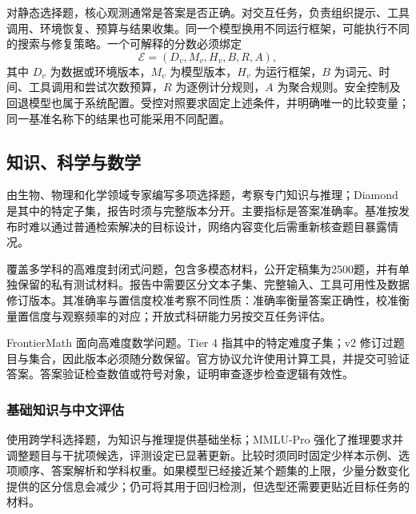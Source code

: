 \documentclass[../textbook.tex]{subfiles}
\begin{document}
对静态选择题，核心观测通常是答案是否正确。对交互任务，负责组织提示、工具调用、环境恢复、预算与结果收集。同一个模型换用不同运行框架，可能执行不同的搜索与修复策略。一个可解释的分数必须绑定
\begin{equation}
 \mathcal E=(D_v,M_v,H_v,B,R,A),
 \label{eq:eval-benchmark-protocol}
\end{equation}
其中 $D_v$ 为数据或环境版本，$M_v$ 为模型版本，$H_v$ 为运行框架，$B$ 为词元、时间、工具调用和尝试次数预算，$R$ 为逐例计分规则，$A$ 为聚合规则。安全控制及回退模型也属于系统配置。受控对照要求固定上述条件，并明确唯一的比较变量；同一基准名称下的结果也可能采用不同配置。

\subsection{知识、科学与数学}
由生物、物理和化学领域专家编写多项选择题，考察专门知识与推理；Diamond 是其中的特定子集，报告时须与完整版本分开。主要指标是答案准确率。基准按发布时难以通过普通检索解决的目标设计，网络内容变化后需重新核查题目暴露情况\cite{rein2024gpqa}。

覆盖多学科的高难度封闭式问题，包含多模态材料，公开定稿集为2500题，并有单独保留的私有测试材料。报告中需要区分文本子集、完整输入、工具可用性及数据修订版本。其准确率与置信度校准考察不同性质：准确率衡量答案正确性，校准衡量置信度与观察频率的对应；开放式科研能力另按交互任务评估\cite{hle2026benchmark}。

FrontierMath 面向高难度数学问题。Tier 4 指其中的特定难度子集；v2 修订过题目与集合，因此版本必须随分数保留。官方协议允许使用计算工具，并提交可验证答案。答案验证检查数值或符号对象，证明审查逐步检查逻辑有效性\cite{epoch2026frontiermathv2}。

\subsubsection{基础知识与中文评估}
使用跨学科选择题，为知识与推理提供基础坐标；MMLU-Pro 强化了推理要求并调整题目与干扰项候选，评测设定已显著更新。比较时须同时固定少样本示例、选项顺序、答案解析和学科权重\cite{hendrycks2021mmlu,wang2024mmlupro}。如果模型已经接近某个题集的上限，少量分数变化提供的区分信息会减少；仍可将其用于回归检测，但选型还需要更贴近目标任务的材料。
\end{document}
